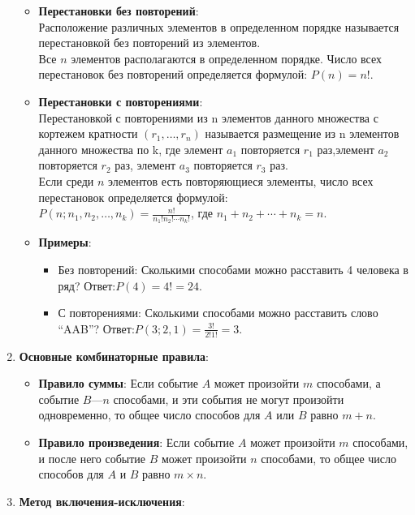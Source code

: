 \documentclass[
]{article}
\providecommand{\tightlist}{%
  \setlength{\itemsep}{0pt}\setlength{\parskip}{0pt}}
\begin{document}
\begin{enumerate}
  \begin{itemize}
  \tightlist
  \item
    \textbf{Перестановки без повторений}:\\ 
Расположение различных элементов в определенном порядке
называется перестановкой без повторений из элементов.\\
    Все \(n\) элементов
    располагаются в определенном порядке. Число всех перестановок без
    повторений определяется формулой: \(P(n) = n!\).
  \item
    \textbf{Перестановки с повторениями}:\\ 
    Перестановкой с повторениями из n элементов данного множества с
кортежем кратности $ (r_1,\dots,r_n )$ называется размещение из n 
элементов данного множества по k, где элемент $ a_1 $ повторяется $r_1$ 
раз,элемент $ a_2$ повторяется $r_2$ раз, элемент $ a_3 $ повторяется $r_3$ 
раз. \\ Если среди \(n\) элементов есть
    повторяющиеся элементы, число всех перестановок определяется
    формулой:\\ \(P(n; n_1, n_2, \ldots, n_k) = \frac{n!}{n_1! n_2! \cdots n_k!}\),
    где \(n_1 + n_2 + \cdots + n_k = n\).
  \item
    \textbf{Примеры}:

    \begin{itemize}
    \tightlist
    \item
      Без повторений: Сколькими способами можно расставить 4 человека в
      ряд? Ответ:\(P(4) = 4! = 24\).
    \item
      С повторениями: Сколькими способами можно расставить слово
      ``AAB''? Ответ:\(P(3; 2, 1) = \frac{3!}{2!1!} = 3\).
    \end{itemize}
  \end{itemize}
\item
  \textbf{Основные комбинаторные правила}:

  \begin{itemize}
  \tightlist
  \item
    \textbf{Правило суммы}: Если событие \(A\) может
    произойти \(m\) способами, а событие \(B\)---\(n\) способами, и эти
    события не могут произойти одновременно, то общее число способов
    для \(A\) или \(B\) равно \(m + n\).
  \item
    \textbf{Правило произведения}: Если событие \(A\) может
    произойти \(m\) способами, и после него событие \(B\) может
    произойти \(n\) способами, то общее число способов
    для \(A\) и \(B\) равно \(m \times n\).
  \end{itemize}
\item
  \textbf{Метод включения-исключения}:


\end{enumerate}
\end{document}
